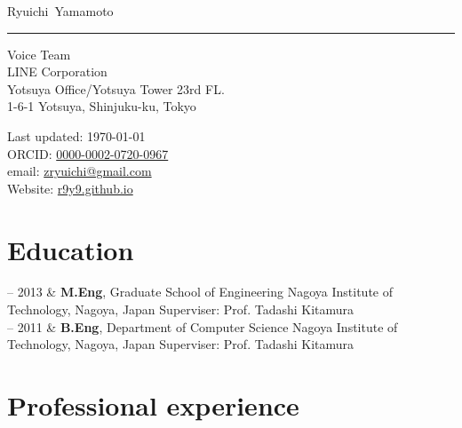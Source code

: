 \documentclass[11pt, a4paper]{article}
\makeatletter
\newcommand{\FirstName}{Ryuichi}
\newcommand{\LastName}{Yamamoto}
\newcommand{\MyName}{\FirstName\ \LastName}
\newcommand{\Email}{zryuichi@gmail.com}
\newcommand{\PersonalWebsite}{r9y9.github.io}
\newcommand{\ORCID}{0000-0002-0720-0967}
\newcommand{\Affiliation}{Voice Team\\LINE Corporation}
\newcommand{\Address}{
  Yotsuya Office/Yotsuya Tower 23rd FL.\\ 1-6-1 Yotsuya, Shinjuku-ku, Tokyo
}
\newcommand{\Duration}[2]{\fontsize{10pt}{0}\selectfont #1 -- #2}
\newcommand{\Ongoing}{present}
\makeatother
\begin{document}
\thispagestyle{empty}

{\fontsize{22pt}{0}\selectfont\MyName}\\[-0.1cm]
\rule{\textwidth}{0.2pt}
\begin{minipage}[t]{0.595\textwidth}
  \Affiliation
  \\
  \Address
\end{minipage}
\begin{minipage}[t]{0.405\textwidth}
  \begin{flushright}
  Last updated: \monthyear\today
  \\
    ORCID: \href{https://orcid.org/\ORCID}{\ORCID}
    \\
    email: \href{mailto:\Email}{\Email}
    \\
    Website: \href{https://\PersonalWebsite}{\PersonalWebsite}
  \end{flushright}
\end{minipage}


\section{Education}

\begin{EntriesTable}
  \Duration{2011}{2013}  & \textbf{M.Eng}, Graduate School of Engineering \newline
  Nagoya Institute of Technology, Nagoya, Japan\newline
  Superviser: Prof. Tadashi Kitamura
  \\
  \Duration{2007}{2011}  & \textbf{B.Eng}, Department of Computer Science \newline
  Nagoya Institute of Technology, Nagoya, Japan\newline
  Superviser: Prof. Tadashi Kitamura
\end{EntriesTable}

\section{Professional experience}
\end{document}
